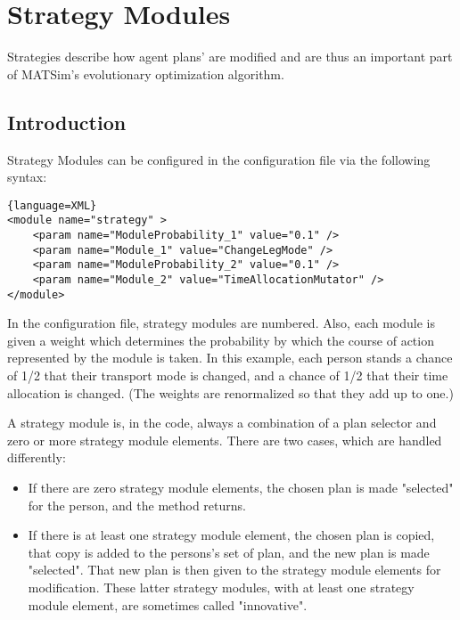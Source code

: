 \chapter{Strategy Modules}

\bigskip

\begin{chapter-intro}
Strategies describe how agent plans' are modified and are thus an important
part of MATSim's evolutionary optimization algorithm. 
\end{chapter-intro}


\section{Introduction}
\label{sec:introduction}


Strategy Modules can be configured in the configuration file via the following syntax:
\begin{lstlisting}{language=XML}
<module name="strategy" >
    <param name="ModuleProbability_1" value="0.1" />
    <param name="Module_1" value="ChangeLegMode" />
    <param name="ModuleProbability_2" value="0.1" />
    <param name="Module_2" value="TimeAllocationMutator" />
</module>
\end{lstlisting}

In the configuration file, strategy modules are numbered. Also, each module is given a weight 
which determines the probability by which the course of action represented by the module is taken. 
In this example, each person stands a chance of 1/2 that their transport mode is changed,  and a chance of 1/2 that their time allocation is changed. (The  weights are renormalized so that they add up to one.)

A strategy module is, in the code, always a combination of a plan  selector and zero or more strategy module elements. There are two cases,  which are handled differently:
\begin{itemize}
	\item If there are zero strategy module elements, the chosen plan is made "selected" for the person, and the method returns.
	\item If there is at least one strategy module element, the chosen plan is  copied, that copy is added to the persons's set of plan, and the new  plan is made "selected". That new plan is then given to the  strategy module elements for modification. These latter strategy  modules, with at least one strategy module element, are sometimes called  "innovative".
\end{itemize}


